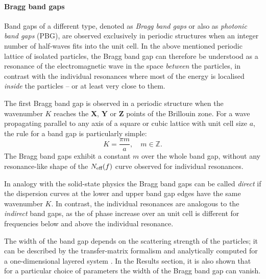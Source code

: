 \paragraph{Bragg band gaps} %
Band gaps of a different type, denoted as \textit{Bragg band gaps} or also as \textit{photonic band gaps} (PBG), are observed exclusively in periodic structures when an integer number of half-waves fits into the unit cell. 
In the above mentioned periodic lattice of isolated particles, the Bragg band gap can therefore be understood as a resonance of the electromagnetic wave in the space \textit{between} the particles, in contrast with the individual resonances where most of the energy is localised \textit{inside} the particles -- or at least very close to them.

The first Bragg band gap is observed in a periodic structure when the wavenumber $K$ reaches the $\mathbf X$, $\mathbf Y$ or $\mathbf Z$ points of the Brillouin zone. For a wave propagating parallel to any axis of a square or cubic lattice with unit cell size $a$, the rule for a band gap is particularly simple:
\begin{equation} K= \frac{\pi m}{a},\quad m\in\mathbb{Z}.  \label{eq_braggbg}\end{equation}
The Bragg band gaps exhibit a constant $m$ over the whole band gap, without any resonance-like shape of the $N_{\text{eff} }(f)$ %
curve observed for individual resonances. 

In analogy with the solid-state physics the Bragg band gaps can be called \textit{direct} if the dispersion curves at the lower and upper band gap edges have the same wavenumber $K$.  In contrast, the individual resonances are analogous to the \textit{indirect} band gaps, as the of phase increase over an unit cell is different  for frequencies below and above the individual resonance. 

The width of the band gap depends on the scattering strength of the particles; it can be  described by the transfer-matrix formalism and analytically computed for a one-dimensional layered system \cite{laktionov2008}. 
In the Results section, it is also shown that for a particular choice of parameters the width of the Bragg band gap can vanish. 

